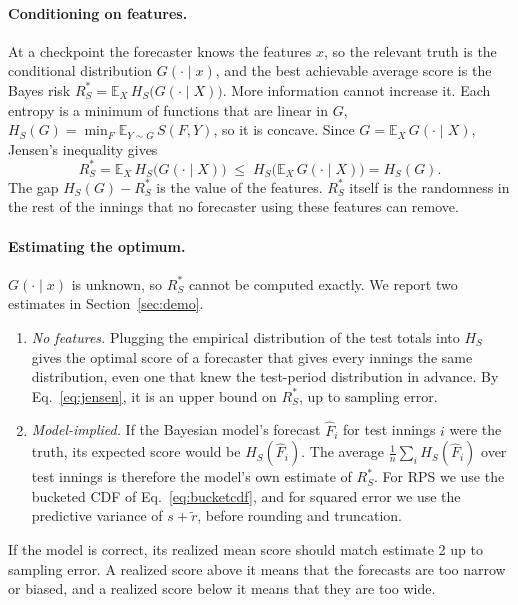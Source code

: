 \documentclass{article}
\newcommand{\1}{\mathbf{1}}
\newcommand{\E}{\mathbb{E}}
\begin{document}
\paragraph{Conditioning on features.} At a checkpoint the forecaster knows the features $x$, so the relevant truth is the conditional distribution $G(\cdot \mid x)$, and the best achievable average score is the Bayes risk $R_S^* = \E_X\, H_S\big(G(\cdot \mid X)\big)$. More information cannot increase it. Each entropy is a minimum of functions that are linear in $G$, $H_S(G) = \min_F \E_{Y \sim G}\, S(F, Y)$, so it is concave. Since $G = \E_X\, G(\cdot \mid X)$, Jensen's inequality gives
\begin{equation}\label{eq:jensen}
R_S^* = \E_X\, H_S\big(G(\cdot \mid X)\big) \;\le\; H_S\big(\E_X\, G(\cdot \mid X)\big) = H_S(G).
\end{equation}
The gap $H_S(G) - R_S^*$ is the value of the features. $R_S^*$ itself is the randomness in the rest of the innings that no forecaster using these features can remove.

\paragraph{Estimating the optimum.} $G(\cdot \mid x)$ is unknown, so $R_S^*$ cannot be computed exactly. We report two estimates in Section~\ref{sec:demo}.
\begin{enumerate}
\item \emph{No features.} Plugging the empirical distribution of the test totals into $H_S$ gives the optimal score of a forecaster that gives every innings the same distribution, even one that knew the test-period distribution in advance. By Eq.~\eqref{eq:jensen}, it is an upper bound on $R_S^*$, up to sampling error.
\item \emph{Model-implied.} If the Bayesian model's forecast $\hat F_i$ for test innings $i$ were the truth, its expected score would be $H_S(\hat F_i)$. The average $\frac1n \sum_i H_S(\hat F_i)$ over test innings is therefore the model's own estimate of $R_S^*$. For RPS we use the bucketed CDF of Eq.~\eqref{eq:bucketcdf}, and for squared error we use the predictive variance of $s + \tilde r$, before rounding and truncation.
\end{enumerate}
If the model is correct, its realized mean score should match estimate 2 up to sampling error. A realized score above it means that the forecasts are too narrow or biased, and a realized score below it means that they are too wide.
\end{document}
